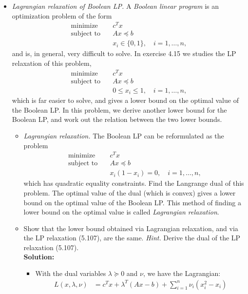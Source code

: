 \documentclass{article}
\begin{document}
\begin{itemize}
  \item[5.13] \textit{Lagrangian relaxation of Boolean LP.} A \textit{Boolean linear program} is an optimization problem of the form
  \begin{align*}
    \text{minimize} \quad & c^T x \\
    \text{subject to} \quad & Ax \preceq b \\
    & x_i \in \{0, 1\}, \quad i = 1, \ldots, n,
  \end{align*}
  and is, in general, very difficult to solve. In exercise 4.15 we studies the LP relaxation of this problem,
  \begin{align*}
    \text{minimize} \quad & c^T x \\
    \text{subject to} \quad & Ax \preceq b \tag{5.107} \\
    & 0 \le x_i \le 1, \quad i = 1, \ldots, n,
  \end{align*}
  which is far easier to solve, and gives a lower bound on the optimal value of the Boolean LP. In this problem, we derive another lower bound for the Boolean LP, and work out the relation between the two lower bounds.
  \begin{itemize}
    \item[(a)] \textit{Lagrangian relaxation.} The Boolean LP can be reformulated as the problem
    \begin{align*}
      \text{minimize} \quad & c^T x \\
      \text{subject to} \quad & Ax \preceq b \\
      & x_i(1 - x_i) = 0, \quad i = 1, \ldots, n,
    \end{align*}
    which has quadratic equality constraints. Find the Langrange dual of this problem. The optimal value of the dual (which is convex) gives a lower bound on the optimal value of the Boolean LP. This method of finding a lower bound on the optimal value is called \textit{Lagrangian relaxation}.
    \item[(b)] Show that the lower bound obtained via Lagrangian relaxation, and via the LP relaxation (5.107), are the same. \textit{Hint.} Derive the dual of the LP relaxation (5.107). \\
    \textbf{Solution:}
    \begin{itemize}
      \item[(a)] With the dual variables $\lambda \succeq 0$ and $\nu$, we have the Lagrangian:
      \begin{align*}
        L(x, \lambda, \nu) &= c^T x + \lambda^T(Ax - b) + \sum_{i=1}^n \nu_i (x_i^2 - x_i) \\

\end{align*}
\end{itemize}
\end{itemize}
\end{itemize}
\end{document}
